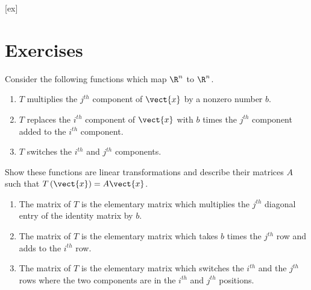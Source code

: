 [ex]
\section*{Exercises}

\begin{enumialphparenastyle}

\begin{ex} \label{exerlineartransf}
Consider the following functions which map $\R^{n}$ to $\R^{n}$. 

\begin{enumerate}
\item $T$ multiplies the $j^{th}$ component of $\vect{x}$ by a nonzero
number $b.$

\item $T$ replaces the $i^{th}$ component of $\vect{x}$ with $b$ times the
$j^{th}$ component added to the $i^{th}$ component.

\item $T$ switches the $i^{th}$ and $j^{th}$ components.
\end{enumerate}

Show these functions are linear transformations and describe their matrices $A$ such that $T\left(\vect{x}\right) = A\vect{x}$.
\begin{sol}
\begin{enumerate}
\item The matrix of $T$ is the elementary matrix which multiplies
the $j^{th}$ diagonal entry of the identity matrix by $b$.
\item The matrix of $T$ is the
elementary matrix which takes $b$ times the $j^{th}$ row and adds to the $%
i^{th}$ row.
\item The matrix of $T$ is the elementary matrix which switches the $%
i^{th}$ and the $j^{th}$ rows where the two components are in the $i^{th}$
and $j^{th}$ positions.
\end{enumerate}
\end{sol}
\end{ex}


\end{enumialphparenastyle}
